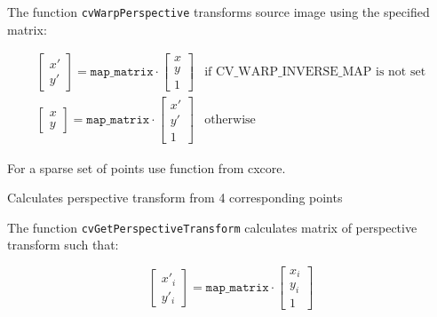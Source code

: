 The function \texttt{cvWarpPerspective} transforms source image using the specified matrix:

\[
\begin{matrix}
\begin{bmatrix}
x'\\
y'
\end{bmatrix} = \texttt{map\_matrix} \cdot \begin{bmatrix}
x\\
y\\
1
\end{bmatrix} & \mbox{if CV\_WARP\_INVERSE\_MAP is not set}\\
\begin{bmatrix}
x\\
y
\end{bmatrix} = \texttt{map\_matrix} \cdot \begin{bmatrix}
x'\\
y'\\
1
\end{bmatrix}& \mbox{otherwise}
\end{matrix}
\]

For a sparse set of points use  function from cxcore.


\label{GetPerspectiveTransform}

Calculates perspective transform from 4 corresponding points


\begin{description}
\end{description}

The function \texttt{cvGetPerspectiveTransform} calculates matrix of perspective transform such that:

\[
\begin{bmatrix}
x'_i\\
y'_i
\end{bmatrix}
=
\texttt{map\_matrix}
\cdot
\begin{bmatrix}
x_i\\
y_i\\
1
\end{bmatrix}
\]

